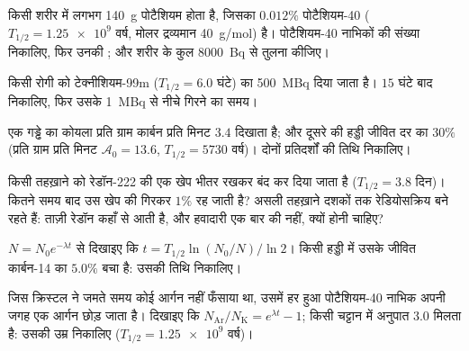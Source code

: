 \begin{exercise}[$\star\star$]\label{exo:g12:radioactive-decay:8}
किसी शरीर में लगभग \qty{140}{g} पोटैशियम होता है, जिसका $0.012\%$ पोटैशियम-40
($T_{1/2} = \num{1.25e9}$ वर्ष, मोलर द्रव्यमान \qty{40}{g/mol}) है। पोटैशियम-40 नाभिकों की संख्या
निकालिए, फिर उनकी ; और शरीर के कुल \qty{8000}{Bq} से तुलना कीजिए।
\end{exercise}

\begin{exercise}[$\star\star$]\label{exo:g12:radioactive-decay:9}
किसी रोगी को टेक्नीशियम-99m ($T_{1/2} = 6.0$ घंटे) का \qty{500}{MBq} दिया जाता है। $15$
घंटे बाद  निकालिए, फिर उसके \qty{1}{MBq} से नीचे गिरने का समय।
\end{exercise}

\begin{exercise}[$\star\star$]\label{exo:g12:radioactive-decay:10}
एक गड्ढे का कोयला प्रति ग्राम कार्बन प्रति मिनट $3.4$  दिखाता है; और
दूसरे की हड्डी जीवित दर का $30\%$ (प्रति ग्राम प्रति मिनट $\mathcal A_0 = 13.6$, $T_{1/2} = \num{5730}$
वर्ष)। दोनों प्रतिदर्शों की तिथि निकालिए।
\end{exercise}

\begin{exercise}[$\star\star$]\label{exo:g12:radioactive-decay:11}
किसी तहख़ाने को रेडॉन-222 की एक खेप भीतर रखकर बंद कर दिया जाता है ($T_{1/2} = 3.8$
दिन)। कितने समय बाद उस खेप की  गिरकर $1\%$ रह जाती है? असली
तहख़ाने दशकों तक रेडियोसक्रिय बने रहते हैं: ताज़ी रेडॉन कहाँ से आती है, और
हवादारी एक बार की नहीं,  क्यों होनी चाहिए?
\end{exercise}

\begin{exercise}[$\star\star\star$]\label{exo:g12:radioactive-decay:12}
$N = N_0 e^{-\lambda t}$ से दिखाइए कि $t = T_{1/2}\ln(N_0/N)/\ln 2$। किसी हड्डी में उसके जीवित कार्बन-14 का $5.0\%$
बचा है: उसकी तिथि निकालिए।
\end{exercise}

\begin{exercise}[$\star\star\star$]\label{exo:g12:radioactive-decay:13}
जिस क्रिस्टल ने जमते समय कोई आर्गन नहीं फँसाया था, उसमें हर  हुआ
पोटैशियम-40 नाभिक अपनी जगह एक आर्गन  छोड़ जाता है।
दिखाइए कि $N_{\mathrm{Ar}}/N_{\mathrm K} = e^{\lambda t} - 1$; किसी चट्टान में अनुपात $3.0$ मिलता है: उसकी उम्र निकालिए
($T_{1/2} = \num{1.25e9}$ वर्ष)।
\end{exercise}

